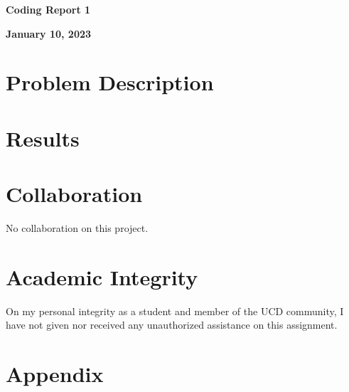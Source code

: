 \documentclass[a4paper,12pt]{article}
\begin{document}
\begin{center} %
	{\Large \bf Coding Report 1} %
	\vspace{2mm}
	
       
	{\bf January 10, 2023}
\end{center}  

\vspace{0.4cm}


\section{Problem Description}

\section{Results}








\section{Collaboration}
No collaboration on this project.


\section{Academic Integrity}
On my personal integrity as a student and member of the UCD community, I have not given nor received any unauthorized assistance on this assignment.


\section{Appendix}



\end{document}
